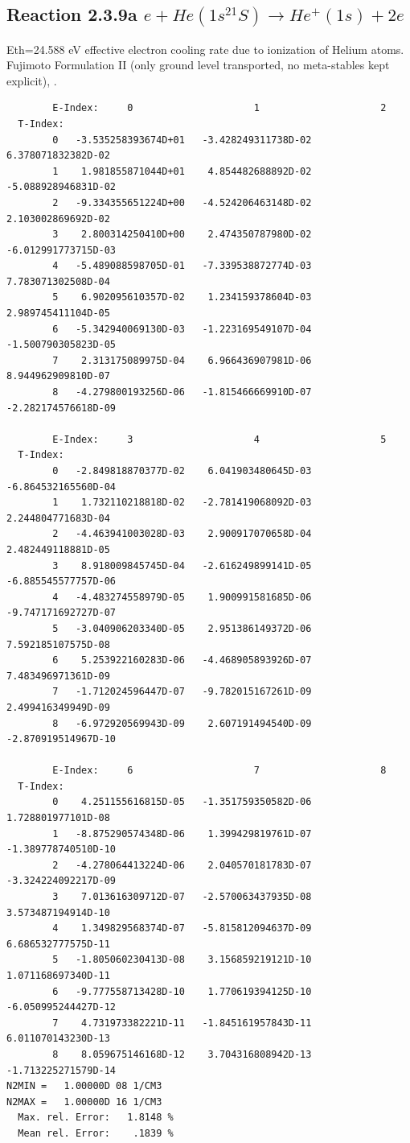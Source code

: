\documentclass[12pt,dvipdfmx]{article}
\begin{document}
\subsection{
Reaction 2.3.9a $e + He(1s^21S) \rightarrow He^+(1s) + 2e$
}
Eth=24.588 eV
   effective electron cooling rate due to ionization of Helium atoms.
Fujimoto Formulation II (only ground level transported, no meta-stables
 kept explicit), \cite{kn:Fujimoto}.

\begin{small}\begin{verbatim}
        E-Index:     0                     1                     2
  T-Index:
        0   -3.535258393674D+01   -3.428249311738D-02    6.378071832382D-02
        1    1.981855871044D+01    4.854482688892D-02   -5.088928946831D-02
        2   -9.334355651224D+00   -4.524206463148D-02    2.103002869692D-02
        3    2.800314250410D+00    2.474350787980D-02   -6.012991773715D-03
        4   -5.489088598705D-01   -7.339538872774D-03    7.783071302508D-04
        5    6.902095610357D-02    1.234159378604D-03    2.989745411104D-05
        6   -5.342940069130D-03   -1.223169549107D-04   -1.500790305823D-05
        7    2.313175089975D-04    6.966436907981D-06    8.944962909810D-07
        8   -4.279800193256D-06   -1.815466669910D-07   -2.282174576618D-09

        E-Index:     3                     4                     5
  T-Index:
        0   -2.849818870377D-02    6.041903480645D-03   -6.864532165560D-04
        1    1.732110218818D-02   -2.781419068092D-03    2.244804771683D-04
        2   -4.463941003028D-03    2.900917070658D-04    2.482449118881D-05
        3    8.918009845745D-04   -2.616249899141D-05   -6.885545577757D-06
        4   -4.483274558979D-05    1.900991581685D-06   -9.747171692727D-07
        5   -3.040906203340D-05    2.951386149372D-06    7.592185107575D-08
        6    5.253922160283D-06   -4.468905893926D-07    7.483496971361D-09
        7   -1.712024596447D-07   -9.782015167261D-09    2.499416349949D-09
        8   -6.972920569943D-09    2.607191494540D-09   -2.870919514967D-10

        E-Index:     6                     7                     8
  T-Index:
        0    4.251155616815D-05   -1.351759350582D-06    1.728801977101D-08
        1   -8.875290574348D-06    1.399429819761D-07   -1.389778740510D-10
        2   -4.278064413224D-06    2.040570181783D-07   -3.324224092217D-09
        3    7.013616309712D-07   -2.570063437935D-08    3.573487194914D-10
        4    1.349829568374D-07   -5.815812094637D-09    6.686532777575D-11
        5   -1.805060230413D-08    3.156859219121D-10    1.071168697340D-11
        6   -9.777558713428D-10    1.770619394125D-10   -6.050995244427D-12
        7    4.731973382221D-11   -1.845161957843D-11    6.011070143230D-13
        8    8.059675146168D-12    3.704316808942D-13   -1.713225271579D-14
N2MIN =   1.00000D 08 1/CM3
N2MAX =   1.00000D 16 1/CM3
  Max. rel. Error:   1.8148 %
  Mean rel. Error:    .1839 %

\end{verbatim}\end{small}
\end{document}
